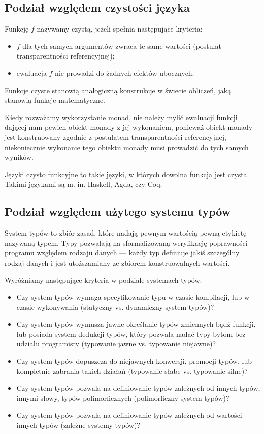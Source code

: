 \documentclass[../praca.tex]{subfiles}
\begin{document}
\subsection{Podział względem czystości języka}

Funkcję \( f \) nazywamy czystą, jeżeli spełnia następujące kryteria:~\cite{Milewski:PF}
\begin{itemize}
  \item \( f \) dla tych samych argumentów zwraca te same wartości
    (postulat transparentności referencyjnej);
  \item ewaluacja \( f \) nie prowadzi do żadnych efektów ubocznych.
\end{itemize}

Funkcje czyste stanowią analogiczną konstrukcje w świecie obliczeń, jaką stanowią
funkcje matematyczne.

\begin{remark}
  Kiedy rozważamy wykorzystanie monad, nie należy mylić ewaluacji funkcji
  dającej nam pewien obiekt monady z jej wykonaniem, ponieważ
  obiekt monady jest konstruowany zgodnie z postulatem transparentności referencyjnej,
  niekoniecznie wykonanie tego obiektu monady musi prowadzić do tych samych wyników.
\end{remark}

Języki czysto funkcyjne to takie języki, w których dowolna funkcja jest czysta. 
Takimi językami są m. in. Haskell, Agda, czy Coq.

\subsection{Podział względem użytego systemu typów}

System typów to zbiór zasad, które nadają pewnym wartością pewną etykietę
nazywaną typem. Typy pozwalają na sformalizowaną weryfikację poprawności
programu względem rodzaju danych --- każdy typ definiuje jakiś szczególny
rodzaj danych i jest utoższamiany ze zbiorem konstruowalnych wartości.~\cite{Pierce:TPL}

Wyróżniamy następujące kryteria w podziale systemach typów:

\begin{itemize}
  \item Czy system typów wymaga specyfikowanie typu w czasie kompilacji,
    lub w czasie wykonywania (statyczny vs. dynamiczny system typów)?
  \item Czy system typów wymusza jawne określanie typów zmiennych
    bądź funkcji, lub posiada system dedukcji typów, który pozwala
    nadać typy bytom bez udziału programisty (typowanie jawne vs.
    typowanie niejawne)?
  \item Czy system typów dopuszcza do niejawnych konwersji, promocji
    typów, lub kompletnie zabrania takich działań (typowanie słabe
    vs. typowanie silne)?
  \item Czy system typów pozwala na definiowanie typów zależnych
    od innych typów, innymi słowy, typów polimorficznych (polimorficzny
    system typów)?
  \item Czy system typów pozwala na definiowanie typów zależnych
    od wartości innych typów (zależne systemy typów)?
\end{itemize}
\end{document}
